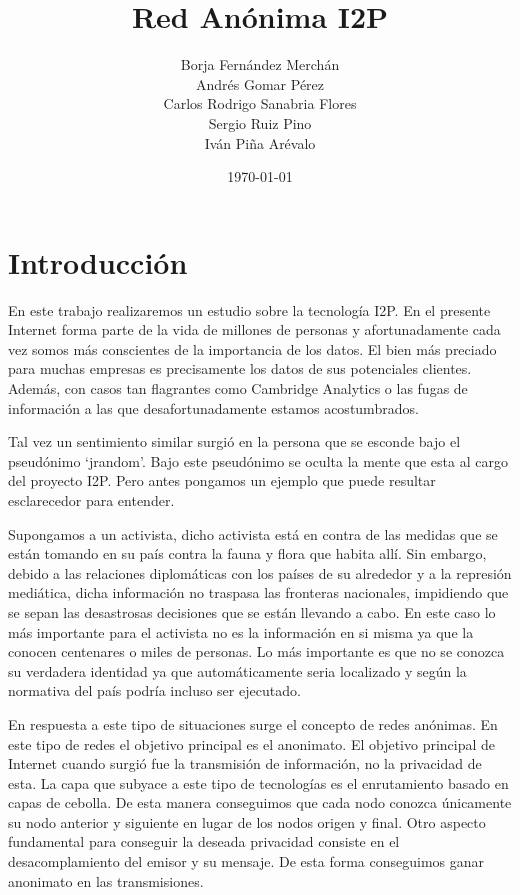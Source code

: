 \documentclass[12]{article}
\title{Red Anónima I2P}
\author{Borja Fernández Merchán \\ Andrés Gomar Pérez \\ Carlos Rodrigo Sanabria Flores \\ Sergio Ruiz Pino
 \\ Iván Piña Arévalo}
\date{\today}
\begin{document}
\maketitle

\section{Introducción}
En este trabajo realizaremos un estudio sobre la tecnología I2P. En el presente Internet forma parte de la vida 
de millones de personas y afortunadamente cada vez somos más conscientes de la importancia de los datos. El bien 
más preciado para muchas empresas es precisamente los datos de sus potenciales clientes. Además, con casos tan 
flagrantes como Cambridge Analytics o las fugas de información a las que desafortunadamente estamos acostumbrados. 

Tal vez un sentimiento similar surgió en la persona que se esconde bajo el pseudónimo ‘jrandom’. Bajo este 
pseudónimo se oculta la mente que esta al cargo del proyecto I2P. Pero antes pongamos un ejemplo que puede resultar 
esclarecedor para entender.

Supongamos a un activista, dicho activista está en contra de las medidas que se están tomando en su país contra 
la fauna y flora que habita allí. Sin embargo, debido a las relaciones diplomáticas con los países de su alrededor
y a la represión mediática, dicha información no traspasa las fronteras nacionales, impidiendo que se sepan las desastrosas 
decisiones que se están llevando a cabo. En este caso lo más importante para el activista no es la información en si misma 
ya que la conocen centenares o miles de personas. Lo más importante es que no se conozca su verdadera identidad ya que 
automáticamente seria localizado y según la normativa del país podría incluso ser ejecutado. 

En respuesta a este tipo de situaciones surge el concepto de redes anónimas. En este tipo de redes el objetivo principal es 
el anonimato. El objetivo principal de Internet cuando surgió fue la transmisión de información, no la privacidad de esta. La 
capa que subyace a este tipo de tecnologías es el enrutamiento basado en capas de cebolla. De esta manera conseguimos que cada 
nodo conozca únicamente su nodo anterior y siguiente en lugar de los nodos origen y final. Otro aspecto fundamental para conseguir 
la deseada privacidad consiste en el desacomplamiento del emisor y su mensaje. De esta forma conseguimos ganar anonimato en las 
transmisiones. 
\end{document}
